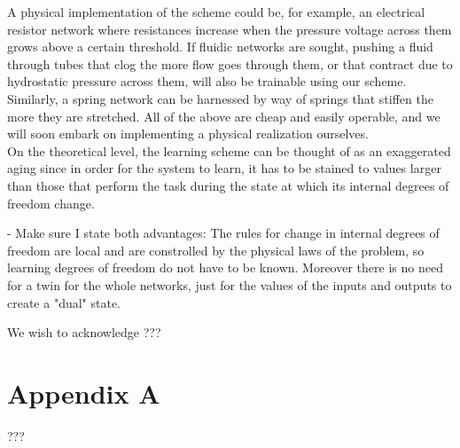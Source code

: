 \documentclass[%
 reprint,
 amsmath,amssymb,
 aps,
]{revtex4-2}
\begin{document}
    A physical implementation of the scheme could be, for example, an electrical resistor network where resistances increase when the pressure voltage across them grows above a certain threshold. If fluidic networks are sought, pushing a fluid through tubes that clog the more flow goes through them, or that contract due to hydrostatic pressure across them, will also be trainable using our scheme. Similarly, a spring network can be harnessed by way of springs that stiffen the more they are stretched. All of the above are cheap and easily operable, and we will soon embark on implementing a physical realization ourselves.\\ 
    On the theoretical level, the learning scheme can be thought of as an exaggerated aging since in order for the system to learn, it has to be stained to values larger than those that perform the task during the state at which its internal degrees of freedom change.

    - Make sure I state both advantages: The rules for change in internal degrees of freedom are local and are constrolled by the physical laws of the problem, so learning degrees of freedom do not have to be known. Moreover there is no need for a twin for the whole networks, just for the values of the inputs and outputs to create a "dual" state.


\begin{acknowledgments}
We wish to acknowledge ???
\end{acknowledgments}

\appendix

\section{Appendix A}

???

\nocite{*}

\end{document}
